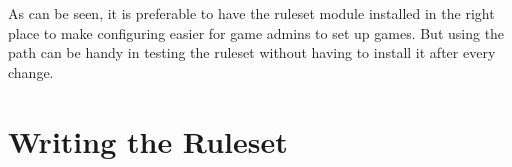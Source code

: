 \documentclass[a4paper,11pt]{report}
\begin{document}
As can be seen, it is preferable to have the ruleset module installed in the right place to make configuring easier for game admins to set up games. But using the path can be handy in testing the ruleset without having to install it after every change.

\chapter{Writing the Ruleset}
\label{chap:ruleset-writing}
\end{document}
